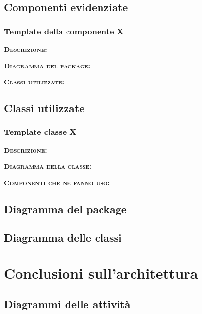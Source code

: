 \subsection{Componenti evidenziate}

\subsubsection{Template della componente X}
\begin{description}
	\item{\scshape\bfseries Descrizione:} 
	\item{\scshape\bfseries Diagramma del package:}
	\item{\scshape\bfseries Classi utilizzate:} 
\end{description}

\subsection{Classi utilizzate}

\subsubsection{Template classe X}
\begin{description}
	\item{\scshape\bfseries Descrizione:} 
	\item{\scshape\bfseries Diagramma della classe:}
	\item{\scshape\bfseries Componenti che ne fanno uso:} 
\end{description}

\subsection{Diagramma del package}

\subsection{Diagramma delle classi}
\clearpage

\section{Conclusioni sull'architettura}

\subsection{Diagrammi delle attività}

